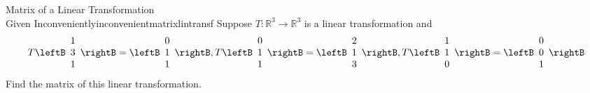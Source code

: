 \begin{example}{Matrix of a Linear Transformation \\ Given Inconveniently}{inconvenientmatrixlintransf}
Suppose $T:\mathbb{R}^{3}\rightarrow \mathbb{R}^{3}$ is a linear
transformation and
\begin{equation*}
T\leftB
\begin{array}{r}
1 \\
3 \\
1
\end{array}
\rightB =\leftB
\begin{array}{r}
0 \\
1 \\
1
\end{array}
\rightB ,T\leftB
\begin{array}{r}
0 \\
1 \\
1
\end{array}
\rightB =\leftB
\begin{array}{r}
2 \\
1 \\
3
\end{array}
\rightB ,T\leftB
\begin{array}{r}
1 \\
1 \\
0
\end{array}
\rightB =\leftB
\begin{array}{r}
0 \\
0 \\
1
\end{array}
\rightB
\end{equation*}
Find the matrix of this linear transformation.
\end{example}

